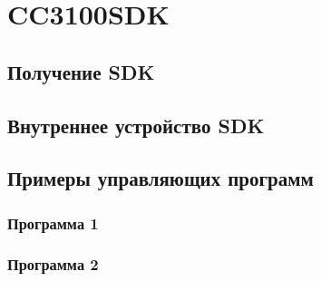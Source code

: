 \chapter{CC3100SDK}
\label{cha:design}

\section{Получение SDK}

\section{Внутреннее устройство SDK}

\section{Примеры управляющих программ}

\subsection{Программа 1}

\subsection{Программа 2}


